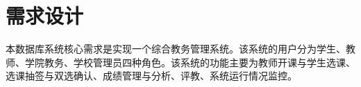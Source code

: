 \section{需求设计}

\ttfamily 本数据库系统核心需求是实现一个{\sffamily 综合教务管理系统}。该系统的用户分为学生、教师、学院教务、学校管理员四种角色。该系统的功能主要为教师开课与学生选课、选课抽签与双选确认、成绩管理与分析、评教、系统运行情况监控。

\normalfont




